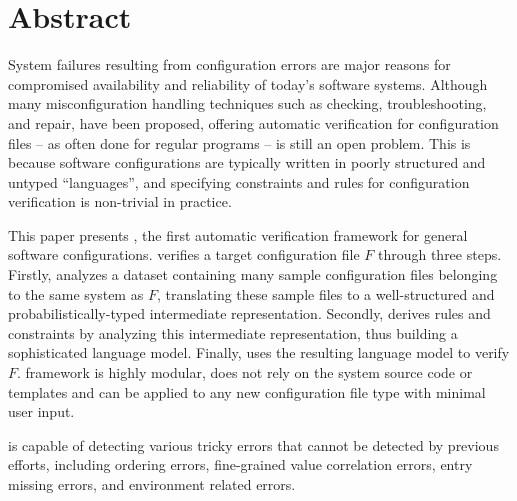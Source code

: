 
\section*{Abstract}

System failures resulting from configuration errors 
are major reasons for compromised availability and
reliability of today's software systems.
Although many misconfiguration handling techniques
such as checking, troubleshooting, and repair, 
have been proposed, 
offering automatic verification for configuration files -- as often  
done for regular programs -- is still an open problem.
This is because software configurations are typically written in
poorly structured and untyped ``languages'', and 
specifying constraints and rules for configuration 
verification is non-trivial in practice.

This paper presents \app, the first automatic verification framework for
general software configurations.
\app verifies a target configuration file $F$ through three steps.
Firstly, \app analyzes a dataset containing many sample configuration 
files belonging to the same system as $F$,
translating these sample files to a
well-structured and probabilistically-typed 
intermediate representation.
Secondly, \app derives rules and constraints by analyzing
this intermediate representation, thus building a
sophisticated language model.
Finally, \app uses the resulting language model to verify $F$.
\app framework is highly modular, 
does not rely on the system source code or templates and
can be applied to any new configuration file type with minimal user input. 

\app is capable of detecting various tricky errors that cannot
be detected by previous efforts,
including ordering errors, fine-grained value correlation errors, 
entry missing errors, and environment related errors. 
